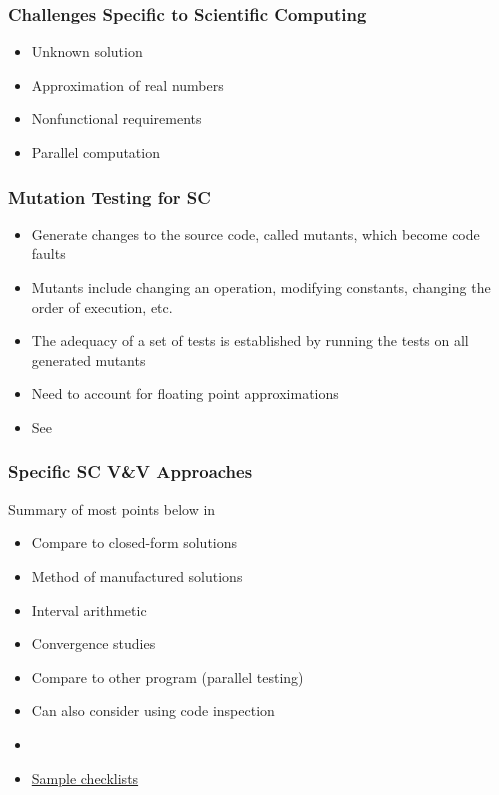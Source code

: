 \documentclass[t,12pt,numbers,fleqn]{beamer}
\begin{document}

\begin{frame}
\frametitle{Challenges Specific to Scientific Computing}
\begin{itemize}
\item Unknown solution
\item Approximation of real numbers
\item Nonfunctional requirements
\item Parallel computation
\end{itemize}
\end{frame}


\begin{frame}
\frametitle{Mutation Testing for SC}
\begin{itemize}
\item Generate changes to the source code, called mutants, which become code faults
\item Mutants include changing an operation, modifying constants, changing the order of execution, etc.
\item The adequacy of a set of tests is established by running the tests on all generated mutants
\item Need to account for floating point approximations
\item See \cite{HookAndKelly2009}
\end{itemize}
\end{frame}


\begin{frame}
\frametitle{Specific SC V\&V Approaches}
Summary of most points below in \cite{Smith2016}
\begin{itemize}
\item Compare to closed-form solutions
\item Method of manufactured solutions \cite{Roache1998}
\item Interval arithmetic \cite{Hickey2001}
\item Convergence studies
\item Compare to other program (parallel testing)
\item Can also consider using code inspection
\bi
\item \cite{KellyAndShepard2000,
  ShepardAndKelly2001}
\item \href{http://www.cs.nott.ac.uk/~pszcah/G53QAT/fi.pdf}{Sample checklists}
\ei
\end{itemize}
\end{frame}
\end{document}
